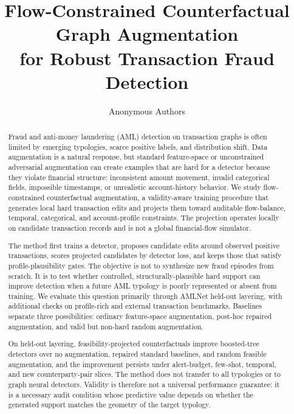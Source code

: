 \documentclass[sigconf,review,anonymous]{acmart}
\begin{document}
\title[Flow-Constrained Counterfactual Graph Augmentation for Robust Transaction Fraud Detection]{Flow-Constrained Counterfactual Graph Augmentation\\
for Robust Transaction Fraud Detection}

\author{Anonymous Authors}

\begin{abstract}
Fraud and anti-money laundering (AML) detection on transaction graphs is often
limited by emerging typologies, scarce positive labels, and distribution shift.
Data augmentation is a natural response, but standard feature-space or
unconstrained adversarial augmentation can create examples that are hard for a
detector because they violate financial structure: inconsistent amount
movement, invalid categorical fields, impossible timestamps, or unrealistic
account-history behavior. We study flow-constrained counterfactual
augmentation, a validity-aware training procedure that generates local hard
transaction edits and projects them toward auditable flow-balance, temporal,
categorical, and account-profile constraints. The projection operates locally
on candidate transaction records and is not a global financial-flow
simulator.

The method first trains a detector, proposes candidate edits around observed
positive transactions, scores projected candidates by detector loss, and keeps
those that satisfy profile-plausibility gates. The objective is not to synthesize
new fraud episodes from scratch. It is to test whether controlled,
structurally-plausible hard support can improve detection when a future AML
typology is poorly represented or absent from training. We evaluate this
question primarily through AMLNet held-out layering, with additional checks on
profile-rich and external transaction benchmarks. Baselines separate three
possibilities: ordinary feature-space augmentation, post-hoc repaired
augmentation, and valid but non-hard random augmentation.

On held-out layering, feasibility-projected counterfactuals improve
boosted-tree detectors over no augmentation, repaired standard baselines, and
random feasible augmentation, and the improvement persists under alert-budget,
few-shot, temporal, and new counterparty-pair slices. The method does not
transfer to all typologies or to graph neural detectors. Validity is
therefore not a universal performance guarantee: it is a necessary audit
condition whose predictive value depends on whether the generated support
matches the geometry of the target typology.
\end{abstract}
\end{document}

